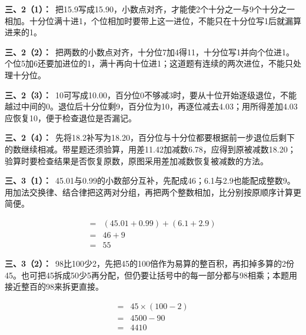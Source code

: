 \documentclass[multi=snippet,border=0pt]{standalone}
\newenvironment{snippet}[3]{\begin{minipage}{#1bp}\color{answerred}\fontsize{#2}{#3}\selectfont\raggedright}{\end{minipage}}
\begin{document}
\begin{snippet}{505}{11.5}{14}\textbf{三、2（1）：}\ 把15.9写成15.90，小数点对齐，才能使2个十分之一与9个十分之一相加。十分位满十进1，个位相加时要带上这一进位，不能只在十分位写1后就漏算进来的1。\end{snippet}
\begin{snippet}{505}{11.5}{14}\textbf{三、2（2）：}\ 把两数的小数点对齐，十分位7加4得11，十分位写1并向个位进1。个位5加6还要加进位的1，满十再向十位进1；这道题有连续的两次进位，不能只处理十分位。\end{snippet}
\begin{snippet}{505}{11.5}{14}\textbf{三、2（3）：}\ 10可写成10.00，百分位0不够减3时，要从十位开始逐级退位，不能越过中间的0。退位后十分位剩9，百分位为10，再逐位减去4.03；用所得差加4.03应恢复10，便于检查退位是否漏记。\end{snippet}
\begin{snippet}{505}{11.5}{14}\textbf{三、2（4）：}\ 先将18.2补写为18.20，百分位与十分位都要根据前一步退位后剩下的数继续相减。带星题还须验算，用差11.42加减数6.78，应得到原被减数18.20；验算时要检查结果是否恢复原数，原图采用差加减数恢复被减数的方法。\end{snippet}
\begin{snippet}{505}{11.5}{14}\textbf{三、3（1）：}\ 45.01与0.99的小数部分互补，先配成46；6.1与2.9也能配成整数9。用加法交换律、结合律把这两对分组，再把两个整数相加，比分别按原顺序计算更简便。\end{snippet}
\begin{snippet}{208.9}{10.5}{12.8}\[\begin{aligned}={}&(45.01+0.99)+(6.1+2.9)\\={}&46+9\\={}&55\end{aligned}\]\end{snippet}
\begin{snippet}{505}{11.5}{14}\textbf{三、3（2）：}\ 98比100少2，先把45的100倍作为易算的整百积，再扣掉多算的2份45。也可把45拆成50少5再分配，但仍要让括号中的每一部分都与98相乘；本题用接近整百的98来拆更直接。\end{snippet}
\begin{snippet}{110.233}{10.5}{12.8}\[\begin{aligned}={}&45\times(100-2)\\={}&4500-90\\={}&4410\end{aligned}\]\end{snippet}
\end{document}
